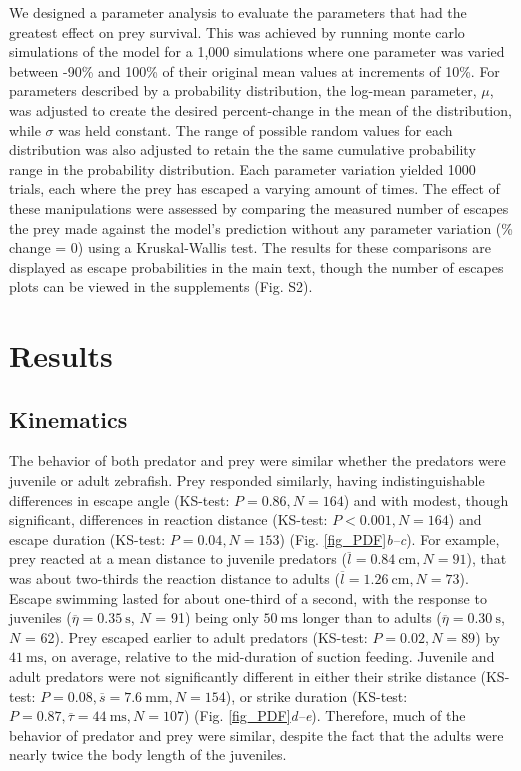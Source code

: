 \documentclass[]{rsos}%
\begin{document}
We designed a parameter analysis to evaluate the parameters that had the greatest effect on prey survival. 
This was achieved by running monte carlo simulations of the model for a 1,000 simulations where one parameter was varied between -90\% and 100\% of their original mean values at increments of 10\%.
For parameters described by a probability distribution, the log-mean parameter, $\mu$, was adjusted to create the desired percent-change in the mean of the distribution, while $\sigma$ was held constant.
The range of possible random values for each distribution was also adjusted to retain the the same cumulative probability range in the probability distribution.
Each parameter variation yielded 1000 trials, each where the prey has escaped a varying amount of times.
The effect of these manipulations were assessed by comparing the measured number of escapes the prey made against the model's prediction without any parameter variation (\% change = 0) using a Kruskal-Wallis test. 
The results for these comparisons are displayed as escape probabilities in the main text, though the number of escapes plots can be viewed in the supplements (Fig. S2).


\section{Results} %

\subsection{Kinematics} %
The behavior of both predator and prey were similar whether the predators were juvenile or adult zebrafish.
Prey responded similarly, having indistinguishable differences in escape angle (KS-test: $P = 0.86, N = 164$) and with modest, though significant, differences in reaction distance (KS-test: $P < 0.001, N = 164$) and escape duration (KS-test: $P = 0.04, N = 153$) (Fig. \ref{fig_PDF}\textit{b--c}). 
For example, prey reacted at a mean distance to juvenile predators ($\overline{l} = \SI{0.84}{\cm}, N = 91$), that was about two-thirds the reaction distance to adults ($\overline{l} = \SI{1.26}{\cm}, N = 73$).
Escape swimming lasted for about one-third of a second, with the response to juveniles ($\overline{\eta} = \SI{0.35}{\s}$, $N$ = 91) being only  $\SI{50}{\ms}$ longer than to adults ($\overline{\eta} = \SI{0.30}{\s}$, $N$ = 62).
Prey escaped earlier to adult predators (KS-test: $P = 0.02, N = 89$) by $\SI{41}{\ms}$, on average, relative to the mid-duration of suction feeding.
Juvenile and adult predators were not significantly different in either their strike distance (KS-test: $P = 0.08, \overline{s} = \SI{7.6}{\mm}, N = 154$), or strike duration (KS-test: $P = 0.87, \overline{\tau} = \SI{44}{\ms}, N = 107$) (Fig. \ref{fig_PDF}\textit{d--e}).
Therefore, much of the behavior of predator and prey were similar, despite the fact that the adults were nearly twice the body length of the juveniles.
\end{document}
